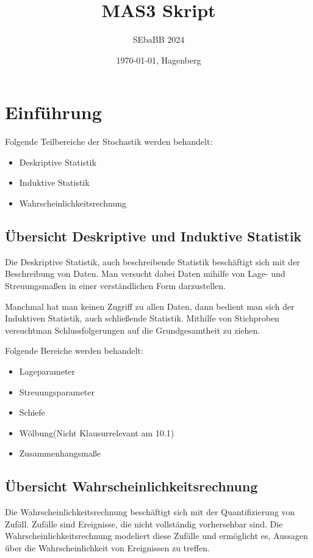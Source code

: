 \documentclass[12pt]{scrartcl}
\title{MAS3 Skript}
\author{SEbaBB 2024}
\date{\today{}, Hagenberg}
\begin{document}
\maketitle
\tableofcontents

\pagebreak

\section{Einführung}

Folgende Teilbereiche der Stochastik werden behandelt:
\begin{itemize}
    \item Deskriptive Statistik
    \item Induktive Statistik
    \item Wahrscheinlichkeitsrechnung
\end{itemize}

\subsection{Übersicht Deskriptive und Induktive Statistik}

Die Deskriptive Statistik, auch beschreibende Statistik beschäftigt sich mit der Beschreibung von Daten.
Man versucht dabei Daten mihilfe von Lage- und Streuungsmaßen in einer verständlichen Form darzustellen.\par

Manchmal hat man keinen Zugriff zu allen Daten, dann bedient man sich der Induktiven Statistik, auch schließende Statistik. Mithilfe von Stichproben versuchtman Schlussfolgerungen auf die Grundgesamtheit zu ziehen.

Folgende Bereiche werden behandelt:
\begin{itemize}
    \item Lageparameter
    \item Streuungsparameter
    \item Schiefe
    \item Wölbung(Nicht Klausurrelevant am 10.1)
    \item Zusammenhangsmaße
\end{itemize}

\subsection{Übersicht Wahrscheinlichkeitsrechnung}

Die Wahrscheinlichkeitsrechnung beschäftigt sich mit der Quantifizierung von Zufäll. Zufälle sind Ereignisse, die nicht vollständig vorhersehbar sind.
Die Wahrscheinlichkeitsrechnung modeliert diese Zufälle und ermöglicht es, Aussagen über die Wahrscheinlichkeit von Ereignissen zu treffen.
\end{document}
